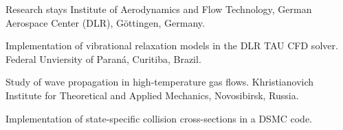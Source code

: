 \begin{rubric}{Research stays}
%
	Institute of Aerodynamics and Flow Technology, German Aerospace Center (DLR), G\"{o}ttingen, Germany.
    \par Implementation of vibrational relaxation models in the DLR TAU CFD solver.
\entry*[Oct. 2016]%
	Federal Unviersity of Paraná, Curitiba, Brazil.
    \par Study of wave propagation in high-temperature gas flows.
\entry*[Feb. 2016]%
	Khristianovich Institute for Theoretical and Applied Mechanics, Novosibirsk, Russia.
    \par Implementation of state-specific collision cross-sections in a DSMC code.
\end{rubric}